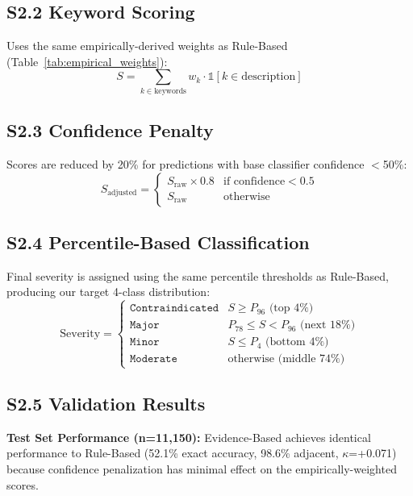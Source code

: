 \documentclass[11pt,a4paper]{article}
\begin{document}
\subsection{S2.2 Keyword Scoring}

Uses the same empirically-derived weights as Rule-Based (Table~\ref{tab:empirical_weights}):
\begin{equation}
S = \sum_{k \in \text{keywords}} w_k \cdot \mathbb{1}[k \in \text{description}]
\end{equation}

\subsection{S2.3 Confidence Penalty}

Scores are reduced by 20\% for predictions with base classifier confidence $<$50\%:
\begin{equation}
S_{\text{adjusted}} = 
\begin{cases}
S_{\text{raw}} \times 0.8 & \text{if confidence} < 0.5 \\
S_{\text{raw}} & \text{otherwise}
\end{cases}
\end{equation}

\subsection{S2.4 Percentile-Based Classification}

Final severity is assigned using the same percentile thresholds as Rule-Based, producing our target 4-class distribution:
\begin{equation}
\text{Severity} = 
\begin{cases}
\texttt{Contraindicated} & S \geq P_{96} \text{ (top 4\%)} \\
\texttt{Major} & P_{78} \leq S < P_{96} \text{ (next 18\%)} \\
\texttt{Minor} & S \leq P_{4} \text{ (bottom 4\%)} \\
\texttt{Moderate} & \text{otherwise (middle 74\%)}
\end{cases}
\end{equation}

\subsection{S2.5 Validation Results}

\textbf{Test Set Performance (n=11,150):} Evidence-Based achieves identical performance to Rule-Based (52.1\% exact accuracy, 98.6\% adjacent, $\kappa$=+0.071) because confidence penalization has minimal effect on the empirically-weighted scores.
\end{document}
